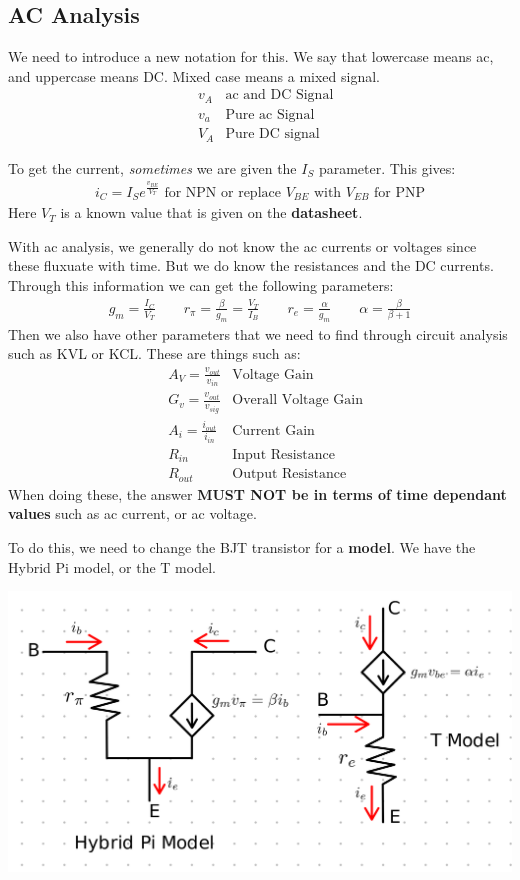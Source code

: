 \documentclass[12pt,letterpaper]{article} \usepackage{amsmath} \usepackage{graphicx} \usepackage[margin=1in]{geometry} \usepackage{longtable}  \usepackage{amssymb}
\begin{document}
	\subsection{AC Analysis}
	We need to introduce a new notation for this. We say that lowercase means ac, and uppercase means DC. Mixed case means a mixed signal.
	\begin{align*}
		&v_A& \text{ac and DC Signal}\\
		&v_a &\text{Pure ac Signal}\\
		&V_A &\text{Pure DC signal}
	\end{align*}

	To get the current, \textit{sometimes} we are given the $I_S$ parameter. This gives:
	\begin{align*}
		i_C = I_S e^{\frac{v_{BE}}{V_T}} \text{ for NPN or replace $V_{BE}$ with $V_{EB}$ for PNP}
	\end{align*}
	Here $V_T$ is a known value that is given on the \textbf{datasheet}. 
	
	With ac analysis, we generally do not know the ac currents or voltages since these fluxuate with time. But we do know the resistances and the DC currents. Through this information we can get the following parameters:
	\begin{align*}
		g_m = \frac{I_C}{V_T} \qquad r_\pi  =\frac{\beta}{g_m} = \frac{V_T}{I_B} \qquad r_e = \frac{\alpha}{g_m}\qquad \alpha = \frac{\beta}{\beta+1}
	\end{align*}
	Then we also have other parameters that we need to find through circuit analysis such as KVL or KCL. These are things such as:
	\begin{align*}
		&A_V = \frac{v_{out}}{v_{in}}&\text{Voltage Gain}\\
		&G_v = \frac{v_{out}}{v_{sig}}&\text{Overall Voltage Gain}\\
		&A_i = \frac{i_{out}}{i_{in}}&\text{Current Gain}\\
		&R_{in} &\text{Input Resistance}\\
		&R_{out}&\text{Output Resistance} 
	\end{align*}
	When doing these, the answer \textbf{MUST NOT be in terms of time dependant values} such as ac current, or ac voltage.
	
	To do this, we need to change the BJT transistor for a \textbf{model}. We have the Hybrid Pi model, or the T model. 
	\begin{center}
		\includegraphics[width=0.8\linewidth]{hybridpi-tmodel}
	\end{center}
	
\end{document}
